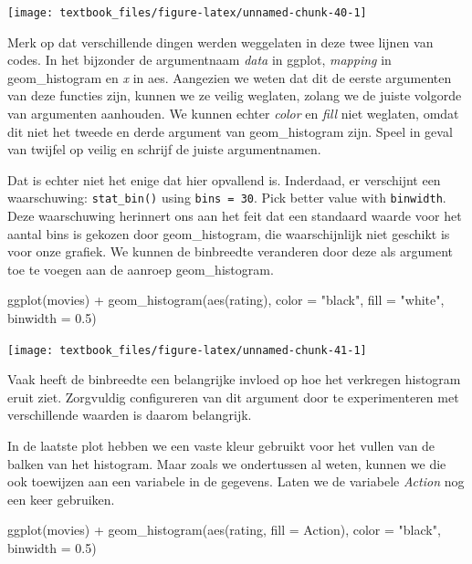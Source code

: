 \documentclass[]{tufte-book}
\newenvironment{Shaded}{}{}
\newcommand{\AttributeTok}[1]{\textcolor[rgb]{0.49,0.56,0.16}{#1}}
\newcommand{\FloatTok}[1]{\textcolor[rgb]{0.25,0.63,0.44}{#1}}
\newcommand{\FunctionTok}[1]{\textcolor[rgb]{0.02,0.16,0.49}{#1}}
\newcommand{\NormalTok}[1]{#1}
\newcommand{\SpecialCharTok}[1]{\textcolor[rgb]{0.25,0.44,0.63}{#1}}
\newcommand{\StringTok}[1]{\textcolor[rgb]{0.25,0.44,0.63}{#1}}
\begin{document}
\texttt{[image: textbook\_files/figure-latex/unnamed-chunk-40-1]}

Merk op dat verschillende dingen werden weggelaten in deze twee lijnen van codes. In het bijzonder de argumentnaam \emph{data} in ggplot, \emph{mapping} in geom\_histogram en \emph{x} in aes. Aangezien we weten dat dit de eerste argumenten van deze functies zijn, kunnen we ze veilig weglaten, zolang we de juiste volgorde van argumenten aanhouden. We kunnen echter \emph{color} en \emph{fill} niet weglaten, omdat dit niet het tweede en derde argument van geom\_histogram zijn. Speel in geval van twijfel op veilig en schrijf de juiste argumentnamen.

Dat is echter niet het enige dat hier opvallend is. Inderdaad, er verschijnt een waarschuwing: \texttt{stat\_bin()} using \texttt{bins\ =\ 30}. Pick better value with \texttt{binwidth}. Deze waarschuwing herinnert ons aan het feit dat een standaard waarde voor het aantal bins is gekozen door geom\_histogram, die waarschijnlijk niet geschikt is voor onze grafiek. We kunnen de binbreedte veranderen door deze als argument toe te voegen aan de aanroep geom\_histogram.

\begin{Shaded}
\begin{Highlighting}[]
\FunctionTok{ggplot}\NormalTok{(movies) }\SpecialCharTok{+}
  \FunctionTok{geom\_histogram}\NormalTok{(}\FunctionTok{aes}\NormalTok{(rating), }\AttributeTok{color =} \StringTok{"black"}\NormalTok{, }\AttributeTok{fill =} \StringTok{"white"}\NormalTok{, }\AttributeTok{binwidth =} \FloatTok{0.5}\NormalTok{)}
\end{Highlighting}
\end{Shaded}

\texttt{[image: textbook\_files/figure-latex/unnamed-chunk-41-1]}

Vaak heeft de binbreedte een belangrijke invloed op hoe het verkregen histogram eruit ziet. Zorgvuldig configureren van dit argument door te experimenteren met verschillende waarden is daarom belangrijk.

In de laatste plot hebben we een vaste kleur gebruikt voor het vullen van de balken van het histogram. Maar zoals we ondertussen al weten, kunnen we die ook toewijzen aan een variabele in de gegevens. Laten we de variabele \emph{Action} nog een keer gebruiken.

\begin{Shaded}
\begin{Highlighting}[]
\FunctionTok{ggplot}\NormalTok{(movies) }\SpecialCharTok{+}
  \FunctionTok{geom\_histogram}\NormalTok{(}\FunctionTok{aes}\NormalTok{(rating, }\AttributeTok{fill =}\NormalTok{ Action), }\AttributeTok{color =} \StringTok{"black"}\NormalTok{, }\AttributeTok{binwidth =} \FloatTok{0.5}\NormalTok{)}
\end{Highlighting}
\end{Shaded}
\end{document}
